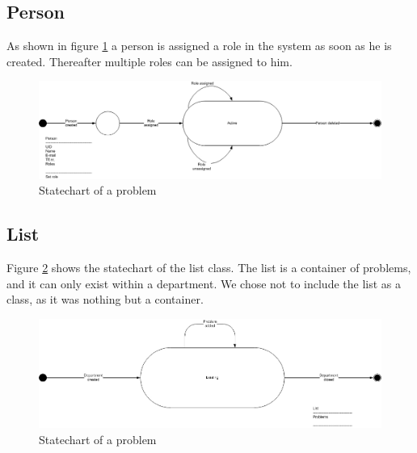 \subsection{Person}
As shown in figure \ref{fig:Klasse_diagram_person} a person is assigned a role in the system as soon as he is created. Thereafter multiple roles can be assigned to him.
\begin{figure}[H]
\begin{center}
\includegraphics[width=1\textwidth]{input/problem_domain_analysis/Klassediagram_person.jpg}
\caption{Statechart of a problem}
\label{fig:Klasse_diagram_person}
\end{center}
\end{figure}

\subsection{List}
Figure \ref{fig:Klasse_diagram_list} shows the statechart of the list class. The list is a container of problems, and it can only exist within a department. We chose not to include the list as a class, as it was nothing but a container.
\begin{figure}[H]
\begin{center}
\includegraphics[width=1\textwidth]{input/problem_domain_analysis/Klassediagram_list.jpg}
\caption{Statechart of a problem}
\label{fig:Klasse_diagram_list}
\end{center}
\end{figure}

